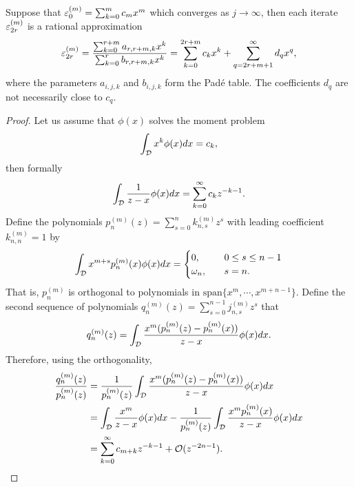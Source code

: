 \begin{theorem}
    Suppose that $\varepsilon_{0}^{(m)} = \sum_{k=0}^m c_m x^m$ which converges as $j\to\infty$, then each iterate $\varepsilon_{2r}^{(m)}$ is a rational approximation 
    \begin{equation}
        \varepsilon_{2r}^{(m)} = \dfrac{\sum_{k=0}^{r+m} a_{r,r+m, k} x^k}{\sum_{k=0}^r b_{r, r+m, k} x^k} = \sum_{k=0}^{2r+m} c_k x^k + \sum_{q = 2r+m+1}^{\infty} d_q x^q,
    \end{equation}
    where the parameters $a_{i,j,k}$ and $b_{i,j,k}$ form the Pad\'e table. The coefficients $d_q$ are not necessarily close to $c_q$.
\end{theorem}
\begin{proof}
    Let us assume that $\phi(x)$ solves the moment problem
    $$\int_{\mathcal D} x^k \phi(x) dx = c_k, $$
    then formally 
    $$\int_{\mathcal D} \frac{1}{z - x} \phi(x) dx = \sum_{k=0}^{\infty} c_k z^{-k-1}.$$
    Define the polynomials $p_{n}^{(m)}(z) = \sum_{s = 0}^{n} k_{n, s}^{(m)} z^s$ with leading coefficient $k_{n,n}^{(m)} = 1$ by 
    \begin{equation}
        \int_{\mathcal D} x^{m+s} p_n^{(m)}(x) \phi(x) dx = \begin{cases}
            0,\quad &0\le s\le n-1 \\
            \omega_n,\quad &s = n.
        \end{cases}
    \end{equation}
    That is, $p_{n}^{(m)}$ is orthogonal to polynomials in $\text{span}\{x^m, \cdots, x^{m+n-1}\}$. Define the second sequence of polynomials $q_{n}^{(m)}(z) = \sum_{s = 0}^{n-1} j_{n,s}^{(m)} z^s$ that 
    \begin{equation}
        q_n^{(m)}(z) = \int_{\mathcal D} \frac{x^m(p_n^{(m)}(z) - p_n^{(m)}(x))}{z - x} \phi(x) dx.
    \end{equation}
    Therefore, using the orthogonality,
    \begin{equation}
    \begin{aligned}
        \frac{q_n^{(m)}(z)}{p_n^{(m)}(z)} &= \frac{1}{p_n^{(m)}(z)}\int_{\mathcal D} \frac{x^m(p_n^{(m)}(z) - p_n^{(m)}(x))}{z - x} \phi(x) dx \\
        &= \int_{\mathcal D} \frac{x^m}{z - x} \phi(x) dx - \frac{1}{p_n^{(m)}(z)} \int_{\mathcal D} \frac{x^m p_{n}^{(m)}(x)}{z - x} \phi(x) dx \\
        &= \sum_{k=0}^{\infty} c_{m+k} z^{-k-1} + \mathcal O(z^{-2n-1}).
    \end{aligned}
    \end{equation}
\end{proof}
